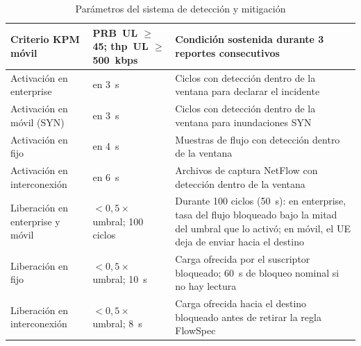 \begin{table}[H]
\begin{center}
\begin{tabular}{ >{\arraybackslash}m{4.5cm} >{\centering\arraybackslash}m{2.5cm} >{\arraybackslash}m{7cm} }
        Criterio KPM móvil & PRB~UL $\geq$ 45; thp~UL $\geq$ 500~kbps & Condición sostenida durante 3 reportes consecutivos \\ \hline
        Activación en enterprise & 3 en 3~s & Ciclos con detección dentro de la ventana para declarar el incidente \\ \hline
        Activación en móvil (SYN) & 3 en 3~s & Ciclos con detección dentro de la ventana para inundaciones SYN \\ \hline
        Activación en fijo & 2 en 4~s & Muestras de flujo con detección dentro de la ventana \\ \hline
        Activación en interconexión & 2 en 6~s & Archivos de captura NetFlow con detección dentro de la ventana \\ \hline
        Liberación en enterprise y móvil & $<0{,}5\times$ umbral; 100 ciclos & Durante 100 ciclos (50~s): en enterprise, tasa del flujo bloqueado bajo la mitad del umbral que lo activó; en móvil, el UE deja de enviar hacia el destino \\ \hline
        Liberación en fijo & $<0{,}5\times$ umbral; 10~s & Carga ofrecida por el suscriptor bloqueado; 60~s de bloqueo nominal si no hay lectura \\ \hline
        Liberación en interconexión & $<0{,}5\times$ umbral; 8~s & Carga ofrecida hacia el destino bloqueado antes de retirar la regla FlowSpec \\ \hline
        \end{tabular}
        \caption{Parámetros del sistema de detección y mitigación}
        \label{tab:config_sistema}
    \end{center}
\end{table}

